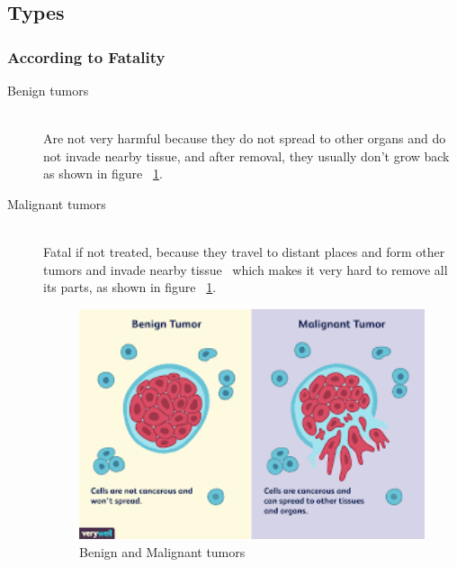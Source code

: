 \subsection{Types}
        \subsubsection{According to Fatality}
        \begin{description}
            \item[Benign tumors] \hfill \\
            Are not very harmful because they do not spread to other organs and do not invade nearby tissue, and after removal, they usually don't grow back~\cite{whatiscancer2021} as shown in figure ~\ref{fig:benignMalignant}.
            \item[Malignant tumors] \hfill \\
            Fatal if not treated, because they travel to distant places and form other tumors and invade nearby tissue~\cite{whatiscancer2021} which makes it very hard to remove all its parts, as shown in figure ~\ref{fig:benignMalignant}.
\begin{figure}[htbp]
\begin{center}
\includegraphics[width=15cm]{./chapter-01-general-medical-information/benign-malignant.png}
\end{center}
\caption{Benign and Malignant tumors  ~\cite{benignMalignant}}
\label{fig:benignMalignant}
\end{figure}
        \end{description}
